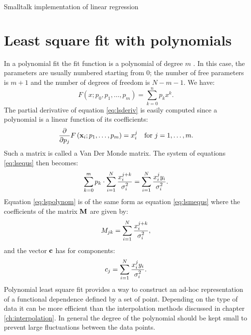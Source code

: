 \documentclass[twoside]{book}
\begin{document}
\begin{listing} Smalltalk implementation of linear regression \label{ls:linreg}

\end{listing}


\section{Least square fit with polynomials}
\label{sec:lsfpol} In a polynomial fit the fit function is a
polynomial of degree $m$ . In this case, the parameters are
usually numbered starting from 0; the number of free parameters is
$m+1$ and the number of degrees of freedom is $N-m-1$. We have:
\begin{equation}
F\left(x;p_0,p_1,\ldots,p_m\right)=\sum_{k=0}^n p_k x^k.
\end{equation}
The partial derivative of equation \ref{eq:lsderiv} is easily
computed since a polynomial is a linear function of its
coefficients:
\begin{equation}
  {\displaystyle \partial\over\displaystyle\partial p_j}
  F\left({\bf x}_i;p_1,\ldots,p_m\right)=x_i^j\mbox{\quad for
  $j=1,\ldots,m$}.
\end{equation}
Such a matrix is called a Van Der Monde matrix. The system of
equations \ref{eq:lsequs} then becomes:
\begin{equation}
\label{eq:lspolynom}
 \sum_{k=0}^m p_k\cdot\sum_{i=1}^N{\displaystyle
x_i^{j+k}\over\displaystyle\sigma_i^2} =\sum_{i=1}^N{\displaystyle
x_i^j y_i\over\displaystyle\sigma_i^2}.
\end{equation}
Equation \ref{eq:lspolynom} is of the same form as equation
\ref{eq:lsmequs} where the coefficients of the matrix ${\bf M}$
are given by:
\begin{equation}
M_{jk}=\sum_{i=1}^N {\displaystyle
x_i^{j+k}\over\displaystyle\sigma_i^2},
\end{equation}
and the vector ${\bf c}$ has for components:
\begin{equation}
c_j =\sum_{i=1}^N{\displaystyle x_i^j
y_i\over\displaystyle\sigma_i^2}.
\end{equation}
Polynomial least square fit provides a way to construct an ad-hoc
representation of a functional dependence defined by a set of
point. Depending on the type of data it can be more efficient than
the interpolation methods discussed in chapter
\ref{ch:interpolation}. In general the degree of the polynomial
should be kept small to prevent large fluctuations between the
data points.
\end{document}
